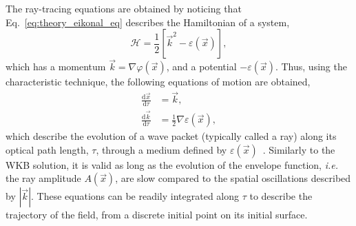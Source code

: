 The ray-tracing equations are obtained by noticing that Eq.~\ref{eq:theory_eikonal_eq} describes the Hamiltonian of a system,
\begin{equation}
    \mathcal{H} = \frac{1}{2} \left[ \vec{k}^2 - \varepsilon(\vec{x}) \right],
\end{equation}
which has a momentum $\vec{k} = \nabla \varphi(\vec{x})$, and a potential $-\varepsilon(\vec{x})$.
Thus, using the characteristic technique, the following equations of motion are obtained,
\begin{align}
    \label{eq:theory_ray_x}
    \frac{\text{d} \vec{x}}{\text{d} \tau}&=\vec{k}, \\
    \label{eq:theory_ray_k}
    \frac{\text{d} \vec{k}}{\text{d} \tau}&=\frac{1}{2} \nabla \varepsilon(\vec{x}),
\end{align}
which describe the evolution of a wave packet (typically called a ray) along its optical path length, $\tau$, through a medium defined by $\varepsilon(\vec{x})$~\cite{colaitis_modeling_2014}.
Similarly to the WKB solution, it is valid as long as the evolution of the envelope function, \textit{i.e.} the ray amplitude $A(\vec{x})$, are slow compared to the spatial oscillations described by $|\vec{k}|$.
These equations can be readily integrated along $\tau$ to describe the trajectory of the field, from a discrete initial point on its initial surface.

